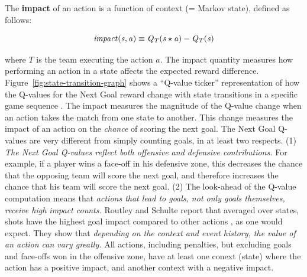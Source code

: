 \documentclass[runningheads,a4paper]{llncs}
\newcommand{\mstate}{s}
\newcommand{\impact}{\it{impact}}
\newcommand{\action}{a}
\newcommand{\team}{T}
\begin{document}
The \textbf{impact} of an action is a function of context (= Markov state), defined as follows:

\begin{equation}
\impact(\mstate,\action) \equiv Q_{\team}(\mstate \star \action) - Q_{\team}(\mstate)
\end{equation}

where $\team$ is the team executing the action $\action$. 
%
%
The impact quantity measures how performing an action in a state affects the expected reward difference. Figure~\ref{fig:state-transition-graph} shows a ``Q-value ticker'' representation of how the Q-values for the Next Goal reward change with state transitions in a specific game sequence \cite{Cervone2014a}. The impact measures the magnitude of the Q-value change when an action takes the match from one state to another. This change measures the impact of an action on the {\em chance} of scoring the next goal. The Next Goal Q-values  are very different from simply counting goals, in at least two respects. (1) {\em The Next Goal Q-values reflect both offensive and defensive contributions.} For example, if a player wins a face-off in his defensive zone, this decreases the chance that the opposing team will score the next goal, and therefore increases the chance that his team will score the next goal.  
(2) The look-ahead of the Q-value computation means that {\em actions that lead to goals, not only goals themselves, receive high impact counts.} Routley and Schulte report that averaged over states, shots have the highest goal impact compared to other actions \cite{Routley2015a}, as one would expect. They show that {\em depending on the context and event history, the value of an action can vary greatly.} All actions, including penalties, but excluding goals and face-offs won in the offensive zone, have at least one conext (state) where the action has a positive impact, and another context with a negative impact.
\end{document}
